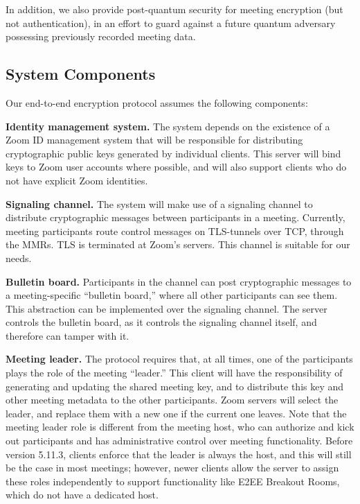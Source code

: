 In addition, we also provide post-quantum security for meeting encryption (but not authentication),
in an effort to guard against a future quantum adversary possessing previously recorded meeting
data.

\subsection{System Components}
\label{subsec:comp}

Our end-to-end encryption protocol assumes the following components:
\begin{description}
\item {\bf Identity management system.} The system depends on the existence of a Zoom ID management
system that will be responsible for distributing cryptographic public keys generated by individual
clients. This server will bind keys to Zoom user accounts where possible, and will also support
clients who do not have explicit Zoom identities.

\item {\bf Signaling channel.} The system will make use of a signaling channel to distribute
cryptographic messages between participants in a meeting. Currently, meeting participants route
control messages on TLS-tunnels over TCP, through the MMRs. TLS is terminated at Zoom's servers.
This channel is suitable for our needs.

\item {\bf Bulletin board.} Participants in the channel can post cryptographic messages to a
meeting-specific ``bulletin board,'' where all other participants can see them. This abstraction can
be implemented over the signaling channel. The server controls the bulletin board, as it controls
the signaling channel itself, and therefore can tamper with it.

\item {\bf Meeting leader.} The protocol requires that, at all times, one of the participants plays
the role of the meeting ``leader.'' This client will have the responsibility of generating and
updating the shared meeting key, and to distribute this key and other meeting metadata to the other
participants. Zoom servers will select the leader, and replace them with a new one if the current
one leaves. Note that the meeting leader role is different from the meeting host, who can authorize
and kick out participants and has administrative control over meeting functionality. Before version
5.11.3, clients enforce that the leader is always the host, and this will still be the case in most
meetings; however, newer clients allow the server to assign these roles independently to support
functionality like E2EE Breakout Rooms, which do not have a dedicated host.

\end{description}

